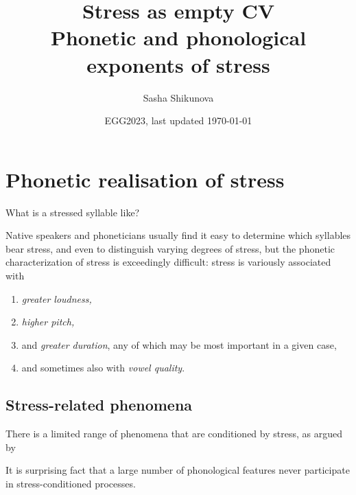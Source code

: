 \documentclass[a4paper, 12pt]{article}
\title{Stress as empty CV \\ {\normalsize Phonetic and phonological exponents of stress}}
\author{Sasha Shikunova}
\date{EGG2023, last updated \today}
\begin{document}
\maketitle


		\section{Phonetic realisation of stress}
		
	What is a stressed syllable like?
	
	\pex
		Native speakers and phoneticians usually find it easy to determine which syllables bear stress, and even to distinguish varying degrees of stress, but the phonetic characterization of stress is exceedingly difficult: stress is variously associated with
		\begin{enumerate}[\ding{170}, labelindent=2cm, leftmargin=*]
			\item \emph{greater loudness,}
			\item \emph{higher pitch,} 
			\item and \emph{greater duration}, any of which may be most important in a given case, 
			\item and sometimes also with \emph{vowel quality}. 
		\end{enumerate}
	\xe

			\subsection{Stress-related phenomena}
			
	There is a limited range of phenomena that are conditioned by stress, as argued by \textcite{giavazzi2010}
	
	\ex
		It is surprising fact that a large number of phonological features never participate in stress-conditioned processes. 
	\xe
	
\end{document}

